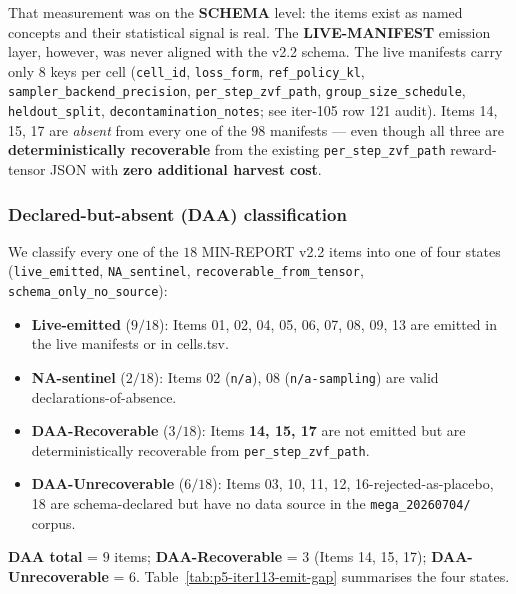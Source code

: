 \documentclass{article}  \usepackage[preprint,nonatbib]{neurips_2026} \usepackage[numbers]{natbib}
\begin{document}
That measurement was on the \textbf{SCHEMA} level: the items exist as
named concepts and their statistical signal is real. The
\textbf{LIVE-MANIFEST} emission layer, however, was never aligned with
the v2.2 schema. The live manifests carry only $8$ keys per cell
(\texttt{cell\_id}, \texttt{loss\_form}, \texttt{ref\_policy\_kl},
\texttt{sampler\_backend\_precision}, \texttt{per\_step\_zvf\_path},
\texttt{group\_size\_schedule}, \texttt{heldout\_split},
\texttt{decontamination\_notes}; see iter-105 row 121 audit). Items 14,
15, 17 are \emph{absent} from every one of the $98$ manifests --- even
though all three are \textbf{deterministically recoverable} from the
existing \texttt{per\_step\_zvf\_path} reward-tensor JSON with
\textbf{zero additional harvest cost}.

\subsubsection{Declared-but-absent (DAA) classification}

We classify every one of the $18$ MIN-REPORT v2.2 items into one of
four states (\texttt{live\_emitted}, \texttt{NA\_sentinel},
\texttt{recoverable\_from\_tensor}, \texttt{schema\_only\_no\_source}):
\begin{itemize}
  \item \textbf{Live-emitted} ($9/18$): Items 01, 02, 04, 05, 06, 07,
        08, 09, 13 are emitted in the live manifests or in cells.tsv.
  \item \textbf{NA-sentinel} ($2/18$): Items 02 (\texttt{n/a}), 08
        (\texttt{n/a-sampling}) are valid declarations-of-absence.
  \item \textbf{DAA-Recoverable} ($3/18$): Items \textbf{14, 15, 17}
        are not emitted but are deterministically recoverable from
        \texttt{per\_step\_zvf\_path}.
  \item \textbf{DAA-Unrecoverable} ($6/18$): Items 03, 10, 11, 12,
        16-rejected-as-placebo, 18 are schema-declared but have no
        data source in the \texttt{mega\_20260704/} corpus.
\end{itemize}
\textbf{DAA total} = $9$ items; \textbf{DAA-Recoverable} = $3$
(Items 14, 15, 17); \textbf{DAA-Unrecoverable} = $6$.
Table~\ref{tab:p5-iter113-emit-gap} summarises the four states.
\end{document}
